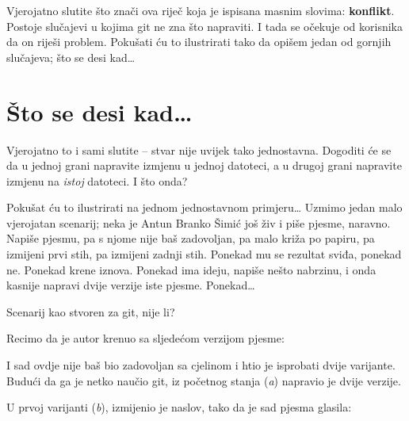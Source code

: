 Vjerojatno slutite što znači ova riječ koja je ispisana masnim slovima: \textbf{konflikt}.
Postoje slučajevi u kojima git ne zna što napraviti. 
I tada se očekuje od korisnika da on riješi problem. 
Pokušati ću to ilustrirati tako da opišem jedan od gornjih slučajeva; što se desi kad\dots

\section*{Što se desi kad\dots}

Vjerojatno to i sami slutite -- stvar nije uvijek tako jednostavna.
Dogoditi će se da u jednoj grani napravite izmjenu u jednoj datoteci, a u drugoj grani napravite izmjenu na \emph{istoj} datoteci.
I što onda?

Pokušat ću to ilustrirati na jednom jednostavnom primjeru\dots
Uzmimo jedan malo vjerojatan scenarij; neka je Antun Branko Šimić još živ i piše pjesme, naravno.
Napiše pjesmu, pa s njome nije baš zadovoljan, pa malo križa po papiru, pa izmijeni prvi stih, pa izmijeni zadnji stih.
Ponekad mu se rezultat sviđa, ponekad ne.
Ponekad krene iznova.
Ponekad ima ideju, napiše nešto nabrzinu, i onda kasnije napravi dvije verzije iste pjesme.
Ponekad\dots

Scenarij kao stvoren za git, nije li?

Recimo da je autor krenuo sa sljedećom verzijom pjesme:


I sad ovdje nije baš bio zadovoljan sa cjelinom i htio je isprobati dvije varijante.
Budući da ga je netko naučio git, iz početnog stanja (\emph a) napravio je dvije verzije.



U prvoj varijanti (\emph b), izmijenio je naslov, tako da je sad pjesma glasila:


